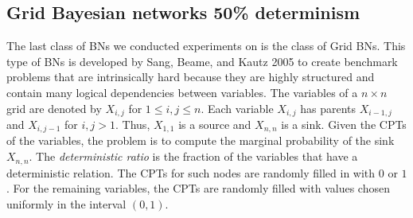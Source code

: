 \documentclass[a4paper, twoside, 11pt]{report}
\theoremstyle{plain}
\theoremstyle{definition}
\theoremstyle{remark}
\begin{document}
\subsection{Grid Bayesian networks 50\% determinism}
The last class of BNs we conducted experiments on is the class of Grid BNs. This type of BNs is developed by Sang, Beame, and Kautz 2005 \cite{sang2005solving} to create benchmark problems that are intrinsically hard because they are highly structured and contain many logical dependencies between variables. The variables of a $n \times n$ grid are denoted by $X_{i,j}$ for $1 \leq i,j \leq n$. Each variable $X_{i,j}$ has parents $X_{i-1,j}$ and $X_{i,j-1}$ for $i,j>1$. Thus, $X_{1,1}$ is a source and $X_{n,n}$ is a sink. Given the CPTs of the variables, the problem is to compute the marginal probability of the sink $X_{n,n}$. The \textit{deterministic ratio} is the fraction of the variables that have a deterministic relation. The CPTs for such nodes are randomly filled in with $0$ or $1$. For the remaining variables, the CPTs are randomly filled with values chosen uniformly in the interval $(0, 1)$.\\
\end{document}
